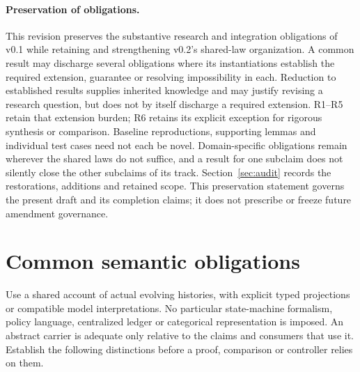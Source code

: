 \documentclass[11pt]{article}
\begin{document}
\paragraph{Preservation of obligations.} This revision preserves the substantive research and integration obligations of v0.1 while retaining and strengthening v0.2's shared-law organization. A common result may discharge several obligations where its instantiations establish the required extension, guarantee or resolving impossibility in each. Reduction to established results supplies inherited knowledge and may justify revising a research question, but does not by itself discharge a required extension. R1--R5 retain that extension burden; R6 retains its explicit exception for rigorous synthesis or comparison. Baseline reproductions, supporting lemmas and individual test cases need not each be novel. Domain-specific obligations remain wherever the shared laws do not suffice, and a result for one subclaim does not silently close the other subclaims of its track. Section~\ref{sec:audit} records the restorations, additions and retained scope. This preservation statement governs the present draft and its completion claims; it does not prescribe or freeze future amendment governance.

\section{Common semantic obligations}\label{sec:semantics}
Use a shared account of actual evolving histories, with explicit typed projections or compatible model interpretations. No particular state-machine formalism, policy language, centralized ledger or categorical representation is imposed. An abstract carrier is adequate only relative to the claims and consumers that use it. Establish the following distinctions before a proof, comparison or controller relies on them.
\end{document}
